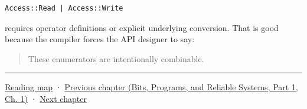 \begin{verbatim}
Access::Read | Access::Write
\end{verbatim}

requires operator definitions or explicit underlying conversion. That is good because the compiler forces the API designer to say:

\begin{quote}
These enumerators are intentionally combinable.
\end{quote}

\begin{center}\rule{0.5\linewidth}{0.5pt}\end{center}

\hyperref[volume-reading-map]{Reading map} · \href{../01-Bits-Programs-and-Reliable-Systems-P01/main.pdf\#01-foundations-i-ch001-from-bits-to-running-systems}{Previous chapter (Bits, Programs, and Reliable Systems, Part 1, Ch. 1)} · \hyperref[01-foundations-i-ch003-records-as-resource-transactions]{Next chapter}
